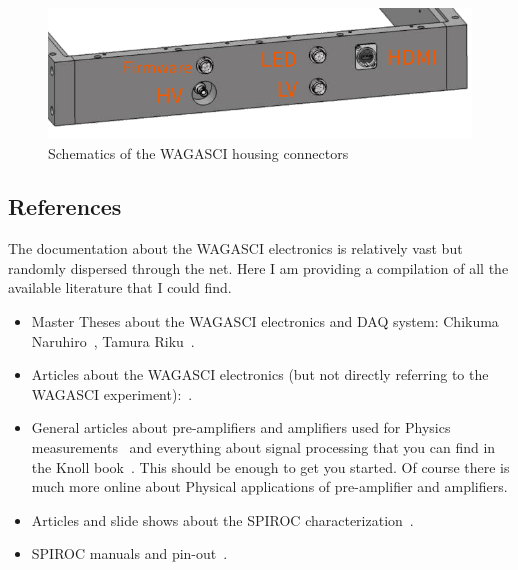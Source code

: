 \begin{figure}[H]
    \centering
    \includegraphics[width=0.7\linewidth,frame]{WAGASCI-housing-schematics}
    \caption{Schematics of the WAGASCI housing
      connectors}\label{fig:WAGASCI-housing-schematics}
  \end{figure}
  
{}

{}

{}

{}

{}






\subsection{References}
The documentation about the WAGASCI electronics is relatively vast but randomly
dispersed through the net. Here I am providing a compilation of all the
available literature that I could find.

\begin{itemize}
\item Master Theses about the WAGASCI electronics and DAQ system: Chikuma
  Naruhiro~\cite{Chikuma:2016}, Tamura Riku~\cite{Tamura:2018}.
\item Articles about the WAGASCI electronics (but not directly referring to the
  WAGASCI experiment):~\cite{Gastaldi:2014vaa,Gastaldi:2014oid,GDCC:2012}.
\item General articles about pre-amplifiers and amplifiers used for Physics
  measurements~\cite{Hamamatsu:2001,Bertuccio:1996,Lioliou:2015,Ortec} and
  everything about signal processing that you can find in the Knoll
  book~\cite{Knoll:2010radiation}. This should be enough to get you started. Of
  course there is much more online about Physical applications of pre-amplifier
  and amplifiers.  
\item Articles and slide shows about the SPIROC
  characterization~\cite{Callier:2008,Callier:2009,Fabbri:2009,%
    Callier:2013,Callier:2015}.
\item SPIROC manuals and
  pin-out~\cite{SPIROC2Dpinlist,SPIROC2Ddatasheet,SPIROC:OMEGA}.
\end{itemize}

